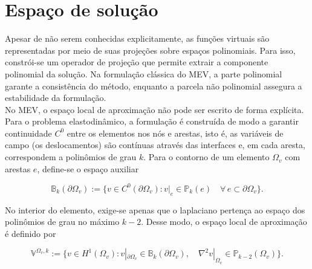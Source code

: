 \section{Espaço de solução}

	\indent Apesar de não serem conhecidas explicitamente, as funções virtuais são representadas por meio de suas projeções sobre espaços polinomiais. Para isso, constrói-se um operador de projeção que permite extrair a componente polinomial da solução. Na formulação clássica do MEV, a parte polinomial garante a consistência do método, enquanto a parcela não polinomial assegura a estabilidade da formulação.\\
    \indent No MEV, o espaço local de aproximação não pode ser escrito de forma explícita. Para o problema elastodinâmico, a formulação é construída de modo a garantir continuidade $C^0$ entre os elementos nos nós e arestas, isto é, as variáveis de campo (os deslocamentos) são contínuas através das interfaces e, em cada aresta, correspondem a polinômios de grau $k$. Para o contorno de um elemento $\Omega_v$ com arestas $e$, define-se o espaço auxiliar

    \begin{equation}
        \mathbb{B}_k(\partial \Omega_v) := \bigl\{v \in C^0(\partial \Omega_v) : v|_{e} \in \mathbb{P}_k(e)\quad \forall\, e \subset \partial \Omega_v\bigr\}.
        \label{eq:4.7}
    \end{equation}

    \indent No interior do elemento, exige-se apenas que o laplaciano pertença ao espaço dos polinômios de grau no máximo $k-2$. Desse modo, o espaço local de aproximação é definido por

    \begin{equation}
        \mathbb{V}^{\Omega_v,k} := \bigl\{v \in H^1(\Omega_v) : v|_{\partial \Omega_v} \in \mathbb{B}_k(\partial \Omega_v), \quad \nabla^2 v|_{\Omega_v} \in \mathbb{P}_{k-2}(\Omega_v)\bigr\}.
        \label{eq:4.8}
    \end{equation}

